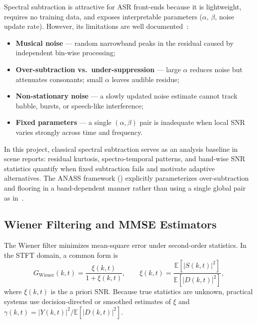 Spectral subtraction is attractive for ASR front-ends because it is lightweight, requires no training data, and exposes interpretable parameters ($\alpha$, $\beta$, noise update rate). However, its limitations are well documented~\cite{loizou2013}:
\begin{itemize}
  \item \textbf{Musical noise} --- random narrowband peaks in the residual caused by independent bin-wise processing;
  \item \textbf{Over-subtraction vs.\ under-suppression} --- large $\alpha$ reduces noise but attenuates consonants; small $\alpha$ leaves audible residue;
  \item \textbf{Non-stationary noise} --- a slowly updated noise estimate cannot track babble, bursts, or speech-like interference;
  \item \textbf{Fixed parameters} --- a single $(\alpha,\beta)$ pair is inadequate when local SNR varies strongly across time and frequency.
\end{itemize}
In this project, classical spectral subtraction serves as an analysis baseline in scene reports: residual kurtosis, spectro-temporal patterns, and band-wise SNR statistics quantify when fixed subtraction fails and motivate adaptive alternatives. The ANASS framework () explicitly parameterizes over-subtraction and flooring in a band-dependent manner rather than using a single global pair as in~.

\subsection{Wiener Filtering and MMSE Estimators}
\label{sec:mmse}

The Wiener filter minimizes mean-square error under second-order statistics. In the STFT domain, a common form is
\begin{equation}
  G_{\mathrm{Wiener}}(k,t) =
  \frac{\xi(k,t)}{1+\xi(k,t)}, \qquad
  \xi(k,t) = \frac{\mathbb{E}[\lvert S(k,t)\rvert^2]}{\mathbb{E}[\lvert D(k,t)\rvert^2]},
  \label{eq:wiener}
\end{equation}
where $\xi(k,t)$ is the a priori SNR. Because true statistics are unknown, practical systems use decision-directed or smoothed estimates of $\xi$ and $\gamma(k,t)=\lvert Y(k,t)\rvert^2/\mathbb{E}[\lvert D(k,t)\rvert^2]$.

